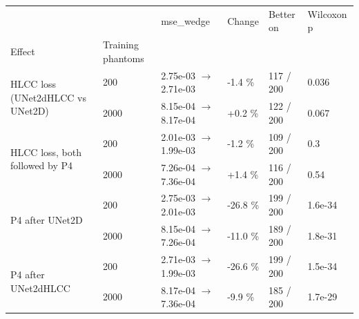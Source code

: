 \begin{tabular}{llllll}
\toprule
 &  & mse\_wedge & Change & Better on & Wilcoxon p \\
Effect & Training phantoms &  &  &  &  \\
\midrule
\multirow[t]{2}{*}{HLCC loss (UNet2dHLCC vs UNet2D)} & 200 & 2.75e-03 $\rightarrow$ 2.71e-03 & -1.4 \% & 117 / 200 & 0.036 \\
 & 2000 & 8.15e-04 $\rightarrow$ 8.17e-04 & +0.2 \% & 122 / 200 & 0.067 \\
\cline{1-6}
\multirow[t]{2}{*}{HLCC loss, both followed by P4} & 200 & 2.01e-03 $\rightarrow$ 1.99e-03 & -1.2 \% & 109 / 200 & 0.3 \\
 & 2000 & 7.26e-04 $\rightarrow$ 7.36e-04 & +1.4 \% & 116 / 200 & 0.54 \\
\cline{1-6}
\multirow[t]{2}{*}{P4 after UNet2D} & 200 & 2.75e-03 $\rightarrow$ 2.01e-03 & -26.8 \% & 199 / 200 & 1.6e-34 \\
 & 2000 & 8.15e-04 $\rightarrow$ 7.26e-04 & -11.0 \% & 189 / 200 & 1.8e-31 \\
\cline{1-6}
\multirow[t]{2}{*}{P4 after UNet2dHLCC} & 200 & 2.71e-03 $\rightarrow$ 1.99e-03 & -26.6 \% & 199 / 200 & 1.5e-34 \\
 & 2000 & 8.17e-04 $\rightarrow$ 7.36e-04 & -9.9 \% & 185 / 200 & 1.7e-29 \\
\cline{1-6}
\bottomrule
\end{tabular}
